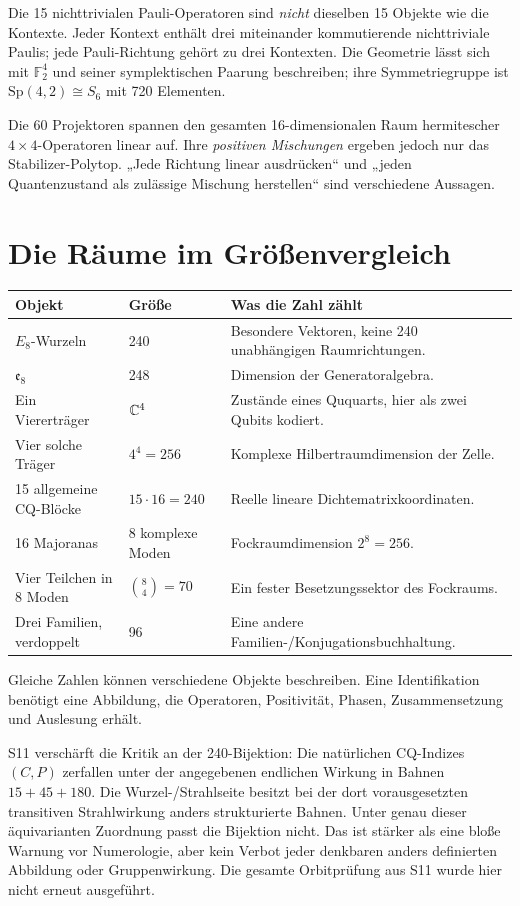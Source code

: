 Die 15 nichttrivialen Pauli-Operatoren sind \emph{nicht} dieselben 15 Objekte wie die Kontexte. Jeder Kontext enthält drei miteinander kommutierende nichttriviale Paulis; jede Pauli-Richtung gehört zu drei Kontexten. Die Geometrie lässt sich mit $\mathbb F_2^4$ und seiner symplektischen Paarung beschreiben; ihre Symmetriegruppe ist $\mathrm{Sp}(4,2)\cong S_6$ mit 720 Elementen.

Die 60 Projektoren spannen den gesamten 16-dimensionalen Raum hermitescher $4\times4$-Operatoren linear auf. Ihre \emph{positiven Mischungen} ergeben jedoch nur das Stabilizer-Polytop. „Jede Richtung linear ausdrücken“ und „jeden Quantenzustand als zulässige Mischung herstellen“ sind verschiedene Aussagen.

\section{Die Räume im Größenvergleich}
\begin{longtable}{L{45mm}L{31mm}L{74mm}}
\toprule
\textbf{Objekt}&\textbf{Größe}&\textbf{Was die Zahl zählt}\\\midrule\endhead
$E_8$-Wurzeln&240&Besondere Vektoren, keine 240 unabhängigen Raumrichtungen.\\
$\mathfrak e_8$&248&Dimension der Generatoralgebra.\\
Ein Viererträger&$\mathbb C^4$&Zustände eines Ququarts, hier als zwei Qubits kodiert.\\
Vier solche Träger&$4^4=256$&Komplexe Hilbertraumdimension der Zelle.\\
15 allgemeine CQ-Blöcke&$15\cdot16=240$&Reelle lineare Dichtematrixkoordinaten.\\
16 Majoranas&8 komplexe Moden&Fockraumdimension $2^8=256$.\\
Vier Teilchen in 8 Moden&$\binom84=70$&Ein fester Besetzungssektor des Fockraums.\\
Drei Familien, verdoppelt&96&Eine andere Familien-/Konjugationsbuchhaltung.\\\bottomrule
\end{longtable}
Gleiche Zahlen können verschiedene Objekte beschreiben. Eine Identifikation benötigt eine Abbildung, die Operatoren, Positivität, Phasen, Zusammensetzung und Auslesung erhält.

S11 verschärft die Kritik an der 240-Bijektion: Die natürlichen CQ-Indizes $(C,P)$ zerfallen unter der angegebenen endlichen Wirkung in Bahnen $15+45+180$. Die Wurzel-/Strahlseite besitzt bei der dort vorausgesetzten transitiven Strahlwirkung anders strukturierte Bahnen. Unter genau dieser äquivarianten Zuordnung passt die Bijektion nicht. Das ist stärker als eine bloße Warnung vor Numerologie, aber kein Verbot jeder denkbaren anders definierten Abbildung oder Gruppenwirkung. Die gesamte Orbitprüfung aus S11 wurde hier nicht erneut ausgeführt.
